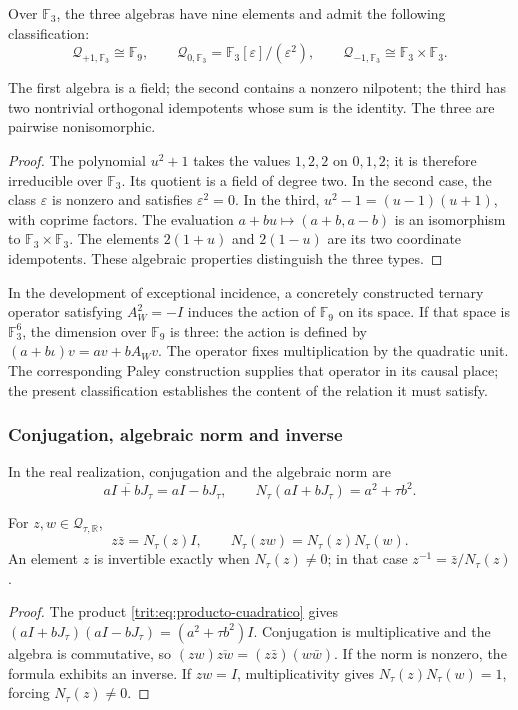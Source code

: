 Over \(\mathbb F_3\), the three algebras have nine elements and admit
the following classification:
\[
 \mathcal Q_{+1,\mathbb F_3}\cong\mathbb F_9,\qquad
 \mathcal Q_{0,\mathbb F_3}=\mathbb F_3[\varepsilon]/(\varepsilon^2),
 \qquad
 \mathcal Q_{-1,\mathbb F_3}\cong\mathbb F_3\times\mathbb F_3.
\]

\begin{proposicion}
\label{trit:prop:tres-tipos}
The first algebra is a field; the second contains a nonzero
nilpotent; the third has two nontrivial orthogonal idempotents whose
sum is the identity. The three are pairwise nonisomorphic.
\end{proposicion}
\begin{proof}
The polynomial \(u^2+1\) takes the values \(1,2,2\) on \(0,1,2\);
it is therefore irreducible over \(\mathbb F_3\). Its quotient is a
field of degree two. In the second case, the class \(\varepsilon\) is
nonzero and satisfies \(\varepsilon^2=0\). In the third,
\(u^2-1=(u-1)(u+1)\), with coprime factors. The evaluation
\(a+bu\mapsto(a+b,a-b)\) is an isomorphism to
\(\mathbb F_3\times\mathbb F_3\). The elements
\(2(1+u)\) and \(2(1-u)\) are its two coordinate idempotents.
These algebraic properties distinguish the three types.
\end{proof}

In the development of exceptional incidence, a concretely
constructed ternary operator satisfying \(A_W^2=-I\) induces the action of
\(\mathbb F_9\) on its space. If that space is \(\mathbb F_3^6\),
the dimension over \(\mathbb F_9\) is three: the action is defined by
\((a+b\iota)v=av+bA_Wv\). The operator fixes multiplication by the
quadratic unit. The corresponding Paley construction supplies that
operator in its causal place; the present classification establishes the
content of the relation it must satisfy.

\subsubsection{Conjugation, algebraic norm and inverse}

In the real realization, conjugation and the algebraic norm are
\[
 \overline{aI+bJ_\tau}=aI-bJ_\tau,\qquad
 N_\tau(aI+bJ_\tau)=a^2+\tau b^2.
\]

\begin{proposicion}
\label{trit:prop:norma}
For \(z,w\in\mathcal Q_{\tau,\mathbb R}\),
\[
 z\bar z=N_\tau(z)I,
 \qquad N_\tau(zw)=N_\tau(z)N_\tau(w).
\]
An element \(z\) is invertible exactly when \(N_\tau(z)\ne0\);
in that case \(z^{-1}=\bar z/N_\tau(z)\).
\end{proposicion}
\begin{proof}
The product \eqref{trit:eq:producto-cuadratico} gives
\((aI+bJ_\tau)(aI-bJ_\tau)=(a^2+\tau b^2)I\).
Conjugation is multiplicative and the algebra is commutative, so
\((zw)\overline{zw}=(z\bar z)(w\bar w)\). If the norm is nonzero,
the formula exhibits an inverse. If \(zw=I\), multiplicativity gives
\(N_\tau(z)N_\tau(w)=1\), forcing \(N_\tau(z)\ne0\).
\end{proof}

